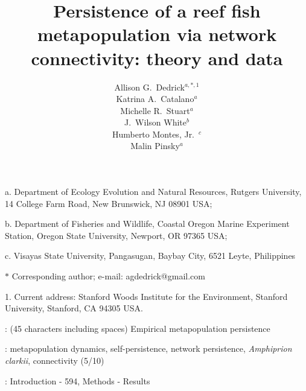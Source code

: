 \documentclass[12pt, oneside]{article}   	%
\author{}
\author{Allison G.\ Dedrick$^{a, \ast, 1}$ \\
Katrina A.\ Catalano$^a$ \\
Michelle R.\ Stuart$^a$ \\
J.\ Wilson White$^b$ \\
Humberto Montes, Jr.\ $^c$ \\
Malin Pinsky$^a$}
\title{Persistence of a reef fish metapopulation via network connectivity: theory and data}
\date{}
\begin{document}
\renewcommand{\topfraction}{0.95}
\maketitle{}

\noindent{} a. Department of Ecology Evolution and Natural Resources, Rutgers University, 14 College Farm Road, New Brunswick, NJ 08901 USA;

\noindent{} b. Department of Fisheries and Wildlife, Coastal Oregon Marine Experiment Station, Oregon State University, Newport, OR 97365 USA;

\noindent{} c. Visayas State University, Pangasugan, Baybay City, 6521 Leyte, Philippines

\noindent{} $\ast$ Corresponding author; e-mail: agdedrick@gmail.com

\noindent{} 1. Current address: Stanford Woods Institute for the Environment, Stanford University, Stanford, CA 94305 USA.


: (45 characters including spaces) Empirical metapopulation persistence

: metapopulation dynamics, self-persistence, network persistence, \textit{Amphiprion clarkii}, connectivity (5/10)

: Introduction - 594, Methods - Results 


\bigskip
\end{document}
